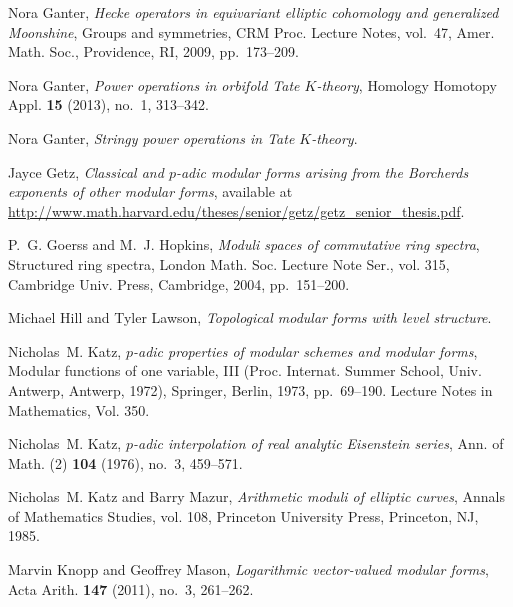 \documentclass{gtpart}
\theoremstyle{definition}
\theoremstyle{remark}
\renewcommand{\=}{\approx}
\renewcommand{\-}{\sim}
\numberwithin{equation}{section}
\begin{document}
\begin{thebibliography}
Nora Ganter, \emph{Hecke operators in equivariant elliptic cohomology and
  generalized {M}oonshine}, Groups and symmetries, CRM Proc. Lecture Notes,
  vol.~47, Amer. Math. Soc., Providence, RI, 2009, pp.~173--209. 

Nora Ganter, \emph{Power operations in orbifold {T}ate {$K$}-theory}, Homology
  Homotopy Appl. \textbf{15} (2013), no.~1, 313--342. 

Nora Ganter, \emph{Stringy power operations in {T}ate {$K$}-theory}. 

Jayce Getz, \emph{Classical and {$p$}-adic modular forms arising from the
  {B}orcherds exponents of other modular forms}, available at \\
  \href{http://www.math.harvard.edu/theses/senior/getz/getz_senior_thesis.pdf}
  {http://www.math.harvard.edu/theses/senior/getz/getz\_senior\_thesis.pdf}.

P.~G. Goerss and M.~J. Hopkins, \emph{Moduli spaces of commutative ring
  spectra}, Structured ring spectra, London Math. Soc. Lecture Note Ser., vol.
  315, Cambridge Univ. Press, Cambridge, 2004, pp.~151--200. 

Michael Hill and Tyler Lawson, \emph{Topological modular forms with level
  structure}. 

Nicholas~M. Katz, \emph{{$p$}-adic properties of modular schemes and modular
  forms}, Modular functions of one variable, {III} ({P}roc. {I}nternat.
  {S}ummer {S}chool, {U}niv. {A}ntwerp, {A}ntwerp, 1972), Springer, Berlin,
  1973, pp.~69--190. Lecture Notes in Mathematics, Vol. 350. 

Nicholas~M. Katz, \emph{{$p$}-adic interpolation of real analytic {E}isenstein 
  series}, Ann. of Math. (2) \textbf{104} (1976), no.~3, 459--571. 

Nicholas~M. Katz and Barry Mazur, \emph{Arithmetic moduli of elliptic curves},
  Annals of Mathematics Studies, vol. 108, Princeton University Press,
  Princeton, NJ, 1985. 

Marvin Knopp and Geoffrey Mason, \emph{Logarithmic vector-valued modular
  forms}, Acta Arith. \textbf{147} (2011), no.~3, 261--262. 


\end{thebibliography}
\end{document}
